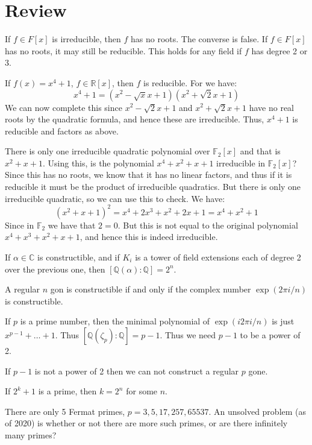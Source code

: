 \section{Review}
    If $f\in{F}[x]$ is irreducible, then $f$ has no roots. The converse is
    false. If $f\in{F}[x]$ has no roots, it may still be reducible. This
    holds for any field if $f$ has degree 2 or 3.
    \begin{example}
        If $f(x)=x^{4}+1$, $f\in\mathbb{R}[x]$, then $f$ is reducible. For
        we have:
        \begin{equation}
            x^{4}+1=(x^{2}-\sqrt{x}x+1)(x^{2}+\sqrt{2}x+1)
        \end{equation}
        We can now complete this since $x^{2}-\sqrt{2}x+1$ and
        $x^{2}+\sqrt{2}x+1$ have no real roots by the quadratic formula,
        and hence these are irreducible. Thus, $x^{4}+1$ is reducible and
        factors as above.
    \end{example}
    \begin{example}
        There is only one irreducible quadratic polynomial over
        $\mathbb{F}_{2}[x]$ and that is $x^{2}+x+1$. Using this, is the
        polynomial $x^{4}+x^{2}+x+1$ irreducible in $\mathbb{F}_{2}[x]$?
        Since this has no roots, we know that it has no linear factors, and
        thus if it is reducible it must be the product of irreducible
        quadratics. But there is only one irreducible quadratic, so we can
        use this to check. We have:
        \begin{equation}
            (x^{2}+x+1)^{2}=
            x^{4}+2x^{3}+x^{2}+2x+1=x^{4}+x^{2}+1
        \end{equation}
        Since in $\mathbb{F}_{2}$ we have that $2=0$. But this is not equal
        to the original polynomial $x^{4}+x^{3}+x^{2}+x+1$, and hence
        this is indeed irreducible.
    \end{example}
    If $\alpha\in\mathbb{C}$ is constructible, and if
    $K_{i}$ is a tower of field extensions each of degree 2 over the
    previous one, then $[\mathbb{Q}(\alpha):\mathbb{Q}]=2^{n}$.
    \begin{theorem}
        A regular $n$ gon is constructible if and only if the complex number
        $\exp(2\pi{i}/n)$ is constructible.
    \end{theorem}
    If $p$ is a prime number, then the minimal polynomial of
    $\exp(i2\pi{i}/n)$ is just $x^{p-1}+\dots+1$. Thus
    $[\mathbb{Q}(\zeta_{p}):\mathbb{Q}]=p-1$. Thus we need $p-1$ to be a
    power of 2.
    \begin{theorem}
        If $p-1$ is not a power of 2 then we can not construct a regular
        $p$ gone.
    \end{theorem}
    \begin{theorem}
        If $2^{k}+1$ is a prime, then $k=2^{n}$ for some $n$.
    \end{theorem}
    There are only 5 Fermat primes, $p=3,5,17,257,65537$. An unsolved
    problem (as of 2020) is whether or not there are more such primes, or
    are there infinitely many primes? 
